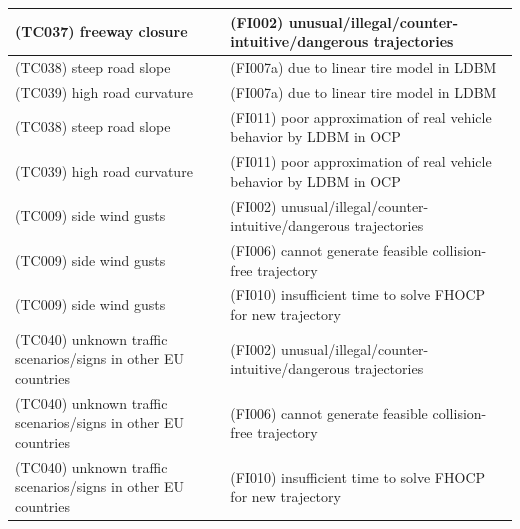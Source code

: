 \begin{longtable}{|p{8cm}|p{8cm}|}
\cellcolor{cYellow}(TC037) freeway closure& \cellcolor{cBlue}(FI002) unusual/illegal/counter-intuitive/dangerous trajectories\\\hline
\cellcolor{cViolet}(TC038) steep road slope& \cellcolor{cBlue}(FI007a) due to linear tire model in LDBM\\\hline
\cellcolor{cViolet}(TC039) high road curvature& \cellcolor{cBlue}(FI007a) due to linear tire model in LDBM\\\hline
\cellcolor{cViolet}(TC038) steep road slope& \cellcolor{cBlue}(FI011) poor approximation of real vehicle behavior by LDBM in OCP\\\hline
\cellcolor{cViolet}(TC039) high road curvature& \cellcolor{cBlue}(FI011) poor approximation of real vehicle behavior by LDBM in OCP\\\hline
\cellcolor{cRed}(TC009) side wind gusts& \cellcolor{cBlue}(FI002) unusual/illegal/counter-intuitive/dangerous trajectories\\\hline
\cellcolor{cRed}(TC009) side wind gusts& \cellcolor{cBlue}(FI006) cannot generate feasible collision-free trajectory\\\hline
\cellcolor{cRed}(TC009) side wind gusts& \cellcolor{cBlue}(FI010) insufficient time to solve FHOCP for new trajectory\\\hline
\cellcolor{cYellow}(TC040) unknown traffic scenarios/signs in other EU countries& \cellcolor{cBlue}(FI002) unusual/illegal/counter-intuitive/dangerous trajectories\\\hline
\cellcolor{cYellow}(TC040) unknown traffic scenarios/signs in other EU countries& \cellcolor{cBlue}(FI006) cannot generate feasible collision-free trajectory\\\hline
\cellcolor{cYellow}(TC040) unknown traffic scenarios/signs in other EU countries& \cellcolor{cBlue}(FI010) insufficient time to solve FHOCP for new trajectory\\\hline
\end{longtable}
